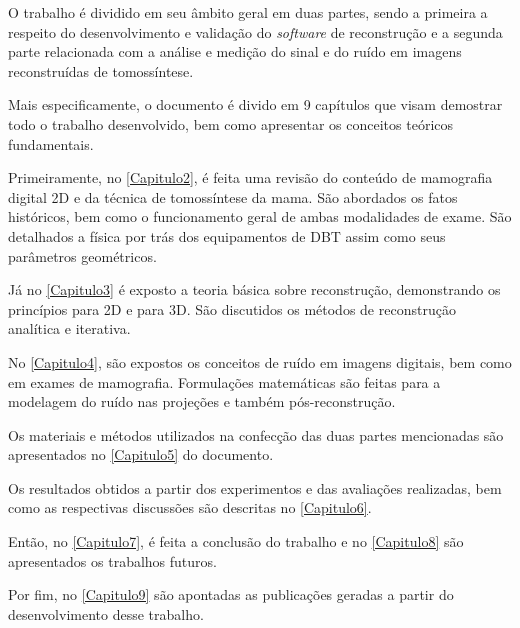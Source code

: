 O trabalho é dividido em seu âmbito geral em duas partes, sendo a primeira a respeito do desenvolvimento e validação do \textit{software} de reconstrução e a segunda parte relacionada com a análise e medição do sinal e do ruído em imagens reconstruídas de tomossíntese.

Mais especificamente, o documento é divido em 9 capítulos que visam demostrar todo o trabalho desenvolvido, bem como apresentar os conceitos teóricos fundamentais. 

Primeiramente, no \autoref{Capitulo2}, é feita uma revisão do conteúdo de mamografia digital \acs{2D} e da técnica de tomossíntese da mama. São abordados os fatos históricos, bem como o funcionamento geral de ambas modalidades de exame. São detalhados a física por trás dos equipamentos de \acs{DBT} assim como seus parâmetros geométricos.

Já no \autoref{Capitulo3} é exposto a teoria básica sobre reconstrução, demonstrando os princípios para \acs{2D} e para \acs{3D}. São discutidos os métodos de reconstrução analítica e iterativa. 

No \autoref{Capitulo4}, são expostos os conceitos de ruído em imagens digitais, bem como em exames de mamografia. Formulações matemáticas são feitas para a modelagem do ruído nas projeções e também pós-reconstrução.

Os materiais e métodos utilizados na confecção das duas partes mencionadas são apresentados no \autoref{Capitulo5}  do documento. 

Os resultados obtidos a partir dos experimentos e das avaliações realizadas, bem como as respectivas discussões são descritas no \autoref{Capitulo6}.

Então, no \autoref{Capitulo7}, é feita a conclusão do trabalho e no \autoref{Capitulo8} são apresentados os trabalhos futuros. 

Por fim, no \autoref{Capitulo9} são apontadas as publicações geradas a partir do desenvolvimento desse trabalho.



  

  

